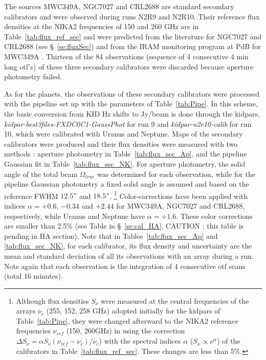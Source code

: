 The sources  MWC349A, NGC7027 and CRL2688 are standard secondary calibrators
and were observed during runs N2R9 and N2R10. Their reference flux densities at
the NIKA2  frequencies of 150 and 260 GHz are in
Table~\ref{tab:flux_ref_sec} and were predicted  from the literature for  NGC7027 and CRL2688
(see \S~\ref{se:fluxSec}) and from the IRAM monitoring program at PdB for MWC349A  \cite{krips}.
Thirteen  of the 84 observations (sequence of 4 consecutive 4 min long otf's) of these three secondary calibrators were discarded because
aperture photometry failed.

As for the planets, the observations of these secondary calibrators were processed with the pipeline set up with the parameters
of Table~\ref{tab:Pipe}. In this scheme, the basic conversion from KID Hz shifts to Jy/beam is done through the   
kidpars,  {\it kidpar-best3files-FXDC0C1-GaussPhot} for run 9 and {\it kidpar-n2r10-calib} for run 10, which were calibrated 
with Uranus and Neptune. Maps of the secondary calibrators were produced and their
flux densities  were measured with two methods : aperture photometry in Table~\ref{tab:flux_sec_Ap},
and  the pipeline Gaussian fit in Table~\ref{tab:flux_sec_NK}. For aperture photometry, the solid angle of the total beam $\Omega_{true}$
was determined for each observation, while  for the pipeline Gaussian photometry a fixed solid angle is assumed 
and  based on the reference FWHM $12.5''$ and $18.5''$.
\footnote {Although flux densities  $S_{\nu}$ were measured at 
the central frequencies of the arrays $\nu_c$ (255, 152, 258 GHz) adopted initially for
the kidpars of Table~\ref{tab:Pipe}, they were changed afterward to the NIKA2 reference
frequencies  $\nu_{ref}$  (150, 260GHz) in using  the correction 
$\Delta S_{\nu}  = \alpha S_{\nu} (\nu_{ref}-\nu_c)/\nu_c $) with the spectral indices $\alpha$ 
($S_{\nu} \propto \nu^{\alpha}$) of the calibrators in Table~\ref{tab:flux_ref_sec}. These changes are less than 5\%.}
Color-corrections have been applied
with indices $\alpha=+0.6$, $-0.34$ and $+2.44$ for MWC349A, NGC7027 and CRL2688, respectively, while Uranus and
Neptune have $\alpha=+1.6$. These color corrections are smaller than 2.5\% (see Table in
\S~\ref{se:cal_HA}, CAUTION : this table is pending in  HA section).  
Note that in Tables~\ref{tab:flux_sec_Ap} and \ref{tab:flux_sec_NK}, for each calibrator, its
flux density and uncertainty  are  the mean and
standard deviation of all its observations with an array during a run.   
Note again that each observation is the integration of 4 consecutive otf scans (total 16 minutes). 

